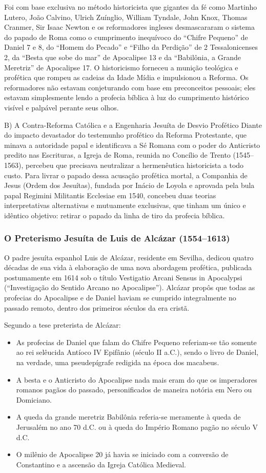 \documentclass[11pt,a4paper,openany]{book}
\begin{document}
Foi com base exclusiva no método historicista que gigantes da fé como Martinho Lutero, João Calvino, Ulrich Zuínglio, William Tyndale, John Knox, Thomas Cranmer, Sir Isaac Newton e os reformadores ingleses desmascararam o sistema do papado de Roma como o cumprimento inequívoco do ``Chifre Pequeno'' de Daniel 7 e 8, do ``Homem do Pecado'' e ``Filho da Perdição'' de 2 Tessalonicenses 2, da ``Besta que sobe do mar'' de Apocalipse 13 e da ``Babilônia, a Grande Meretriz'' de Apocalipse 17. O historicismo forneceu a munição teológica e profética que rompeu as cadeias da Idade Mídia e impulsionou a Reforma. Os reformadores não estavam conjeturando com base em preconceitos pessoais; eles estavam simplesmente lendo a profecia bíblica à luz do cumprimento histórico visível e palpável perante seus olhos.

B) A Contra-Reforma Católica e a Engenharia Jesuíta de Desvio Profético
Diante do impacto devastador do testemunho profético da Reforma Protestante, que minava a autoridade papal e identificava a Sé Romana com o poder do Anticristo predito nas Escrituras, a Igreja de Roma, reunida no Concílio de Trento (1545–1563), percebeu que precisava neutralizar a hermenêutica historicista a todo custo. Para livrar o papado dessa acusação profética mortal, a Companhia de Jesus (Ordem dos Jesuítas), fundada por Inácio de Loyola e aprovada pela bula papal Regimini Militantis Ecclesiae em 1540, concebeu duas teorias interpretativas alternativas e mutuamente exclusivas, que tinham um único e idêntico objetivo: retirar o papado da linha de tiro da profecia bíblica.


\subsubsection*{O Preterismo Jesuíta de Luis de Alcázar (1554–1613)}
O padre jesuíta espanhol Luis de Alcázar, residente em Sevilha, dedicou quatro décadas de sua vida à elaboração de uma nova abordagem profética, publicada postumamente em 1614 sob o título Vestigatio Arcani Sensus in Apocalypsi (``Investigação do Sentido Arcano no Apocalipse''). Alcázar propôs que todas as profecias do Apocalipse e de Daniel haviam se cumprido integralmente no passado remoto, dentro dos primeiros séculos da era cristã.

Segundo a tese preterista de Alcázar:
\begin{itemize}
  \item As profecias de Daniel que falam do Chifre Pequeno referiam-se tão somente ao rei selêucida Antíoco IV Epifânio (século II a.C.), sendo o livro de Daniel, na verdade, uma pseudepígrafe redigida na época dos macabeus.
  \item A besta e o Anticristo do Apocalipse nada mais eram do que os imperadores romanos pagãos do passado, personificados de maneira notória em Nero ou Domiciano.
  \item A queda da grande meretriz Babilônia referia-se meramente à queda de Jerusalém no ano 70 d.C. ou à queda do Império Romano pagão no século V d.C.
  \item O milênio de Apocalipse 20 já havia se iniciado com a conversão de Constantino e a ascensão da Igreja Católica Medieval.
\end{itemize}
\end{document}
